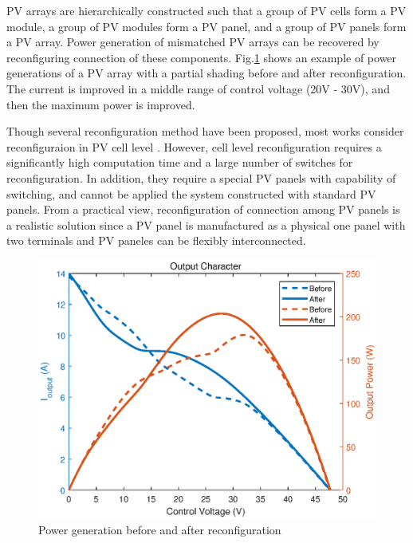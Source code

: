 \documentclass[conference]{IEEEtran}
\begin{document}
PV arrays are hierarchically constructed such that a group of PV cells form a PV module, a group of PV modules form a PV panel, and a group of PV panels form a PV array. Power generation of mismatched PV arrays can be recovered by reconfiguring connection of these components. 
Fig.\ref{compare} shows an example of power generations of a PV array with a partial shading before and after reconfiguration. The current is improved in a middle range of control voltage (20V - 30V), and then the maximum power is improved. 

Though several reconfiguration method have been proposed, most works consider reconfiguraion in PV cell level \cite{nguyen2008adaptive,wang2014architecture,storey2013improved,storey2014optimized}. 
However, cell level reconfiguration requires a significantly high computation time and a large number of switches for reconfiguration. In addition, they require a special PV panels with capability of switching, and cannot be applied the system constructed with standard PV panels. From a practical view, reconfiguration of connection among PV panels is a realistic solution since a PV panel is manufactured as a physical one panel with two terminals and PV paneles can be flexibly interconnected. 

\begin{figure}[t]
    \centering
    \includegraphics[width=0.8\linewidth]{compare.eps}
    \caption{Power generation before and after reconfiguration}
    \label{compare}
\end{figure}
\end{document}
